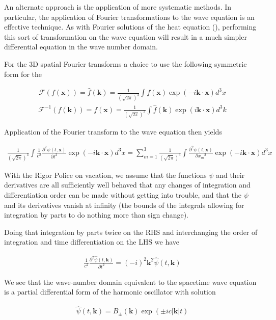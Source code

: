 \documentclass[]{eliblog}
\newcommand{\Abs}[1]{{\left\lvert{#1}\right\rvert}}
\newcommand{\Bk}[0]{\mathbf{k}}
\newcommand{\Bx}[0]{\mathbf{x}}
\newcommand{\inv}[1]{\frac{1}{#1}}
\newcommand{\FF}[0]{\mathcal{F}}
\begin{document}
An alternate approach is the application of more systematic methods.  In particular, the application of Fourier transformations to the wave equation is an effective technique.  As with Fourier solutions of the heat equation (\cite{osgoodFourier}), performing this sort of transformation on the wave equation will result in a much simpler differential equation in the wave number domain.

For the 3D spatial Fourier transforms a choice to use the following symmetric form for the 

\begin{align}
\FF(f(\Bx)) = \hat{f}(\Bk) = \inv{(\sqrt{2\pi})^3} \int f(\Bx) \exp\left( -i \Bk \cdot \Bx \right) d^3 x 
\end{align}
\begin{align}
\FF^{-1}({f}(\Bk)) = f(\Bx) = \inv{(\sqrt{2\pi})^3} \int \hat{f}(\Bk) \exp\left( i \Bk \cdot \Bx \right) d^3 k
\end{align}

Application of the Fourier transform to the wave equation then yields

\begin{align}
\inv{(\sqrt{2\pi})^3} \int 
\inv{c^2} \frac{\partial^2 \psi(t,\Bx)}{\partial t^2}
\exp\left( -i \Bk \cdot \Bx \right) d^3 x 
=
\sum_{m=1}^3 \inv{(\sqrt{2\pi})^3} \int \frac{\partial^2 \psi(t, \Bx) }{\partial {x_m}^2} \exp\left( -i \Bk \cdot \Bx \right) d^3 x 
\end{align}

With the Rigor Police on vacation, we assume that the functions $\psi$ and their derivatives are all sufficiently well behaved that any changes of integration and differentiation order can be made without getting into trouble, and that the $\psi$ and its derivatives vanish at infinity (the bounds of the integrals allowing for integration by parts to do nothing more than sign change).

Doing that integration by parts twice on the RHS and interchanging the order of integration and time differentiation on the LHS we have

\begin{align}
\inv{c^2} \frac{\partial^2 \hat{\psi}(t,\Bk)}{\partial t^2} = (-i)^2 \Bk^2 \hat{\psi}(t,\Bk)
\end{align}

We see that the wave-number domain equivalent to the spacetime wave equation is a partial differential form of the harmonic oscillator with solution

\begin{align}
\hat{\psi}(t,\Bk) = B_{\pm}(\Bk) \exp(\pm i c \Abs{\Bk} t)
\end{align}
\end{document}
